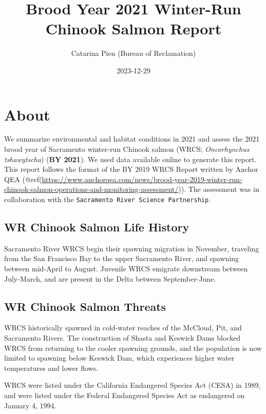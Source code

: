 \documentclass[
]{book}
\title{Brood Year 2021 Winter-Run Chinook Salmon Report}
\author{Catarina Pien (Bureau of Reclamation)}
\date{2023-12-29}
\theoremstyle{definition}
\theoremstyle{definition}
\theoremstyle{definition}
\theoremstyle{definition}
\theoremstyle{remark}
\begin{document}
\maketitle

{
\setcounter{tocdepth}{1}
\tableofcontents
}
\hypertarget{about}{%
\chapter{About}\label{about}}

We summarize environmental and habitat conditions in 2021 and assess the 2021 brood year of Sacramento winter-run Chinook salmon (WRCS; \emph{Oncorhynchus tshawytscha}) (\textbf{BY 2021}). We used data available online to generate this report. This report follows the format of the BY 2019 WRCS Report written by Anchor QEA (@ref(\url{https://www.anchorqea.com/news/brood-year-2019-winter-run-chinook-salmon-operations-and-monitoring-assessment/})). The assessment was in collaboration with the \texttt{Sacramento\ River\ Science\ Partnership}.

\hypertarget{wr-chinook-salmon-life-history}{%
\section{WR Chinook Salmon Life History}\label{wr-chinook-salmon-life-history}}

Sacramento River WRCS begin their spawning migration in November, traveling from the San Francisco Bay to the upper Sacramento River, and spawning between mid-April to August. Juvenile WRCS emigrate downstream between July-March, and are present in the Delta between September-June.

\hypertarget{wr-chinook-salmon-threats}{%
\section{WR Chinook Salmon Threats}\label{wr-chinook-salmon-threats}}

WRCS historically spawned in cold-water reaches of the McCloud, Pit, and Sacramento Rivers. The construction of Shasta and Keswick Dams blocked WRCS from returning to the cooler spawning grounds, and the population is now limited to spawning below Keswick Dam, which experiences higher water temperatures and lower flows.

WRCS were listed under the California Endangered Species Act (CESA) in 1989, and were listed under the Federal Endangered Species Act as endangered on January 4, 1994.
\end{document}
